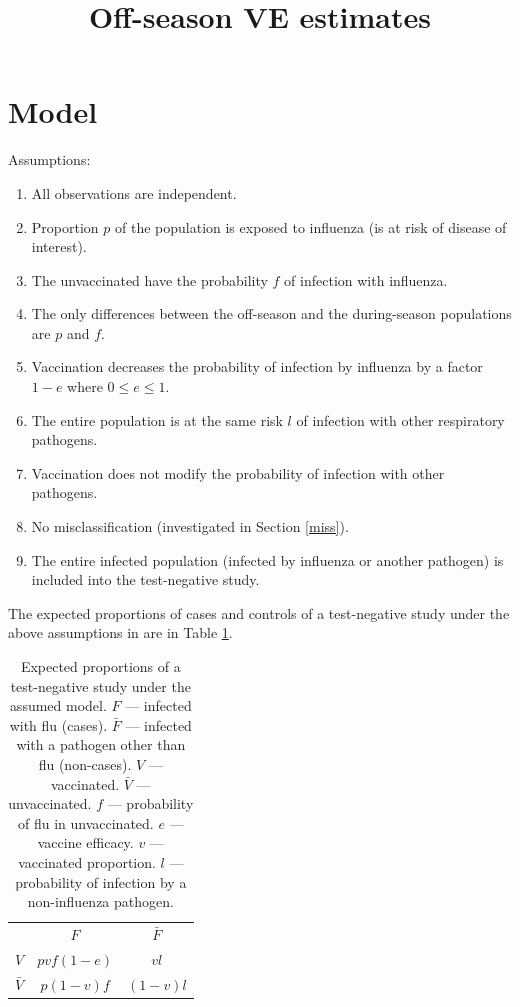 \documentclass[12pt]{article}
\title{Off-season VE estimates}
\begin{document}
\maketitle


\pagebreak
%
\section{Model}

Assumptions:

\begin{enumerate}
\item All observations are independent.
\item Proportion $p$ of the population is exposed to influenza (is at risk of disease of interest).
\item The unvaccinated have the probability $f$ of infection with influenza.
\item The only differences between the off-season and the during-season populations are $p$ and $f$.
\item Vaccination decreases the probability of infection by influenza by a factor $1 - e$ where $0 \leq e \leq 1$.
\item The entire population is at the same risk $l$ of infection with other respiratory pathogens.
\item Vaccination does not modify the probability of infection with other pathogens.
\item No misclassification (investigated in Section \ref{miss}).
\item The entire infected population (infected by influenza or another pathogen) is included into the test-negative study.
\end{enumerate}

The expected proportions of cases and controls of a test-negative study under the above assumptions in are in Table \ref{ExpectedCounts}.

\begin{table}[htp]
\centering
\caption{
	Expected proportions of a test-negative study under the assumed model. $F$ --- infected with flu (cases). $\bar{F}$ --- infected with a pathogen other than flu (non-cases). $V$ --- vaccinated. $\bar{V}$ --- unvaccinated. $f$ --- probability of flu in unvaccinated. $e$ --- vaccine efficacy. $v$ --- vaccinated proportion. $l$ --- probability of infection by a non-influenza pathogen.
	\label{ExpectedCounts}
}
\begin{tabular}{ccc}
	\toprule
	& $F$ & $\bar{F}$ \\
	$V$ & $pvf(1-e)$ & $vl$ \\
	$\bar{V}$ & $p(1-v)f$ & $(1-v)l$ \\
	\bottomrule
\end{tabular}
\end{table}
\end{document}
